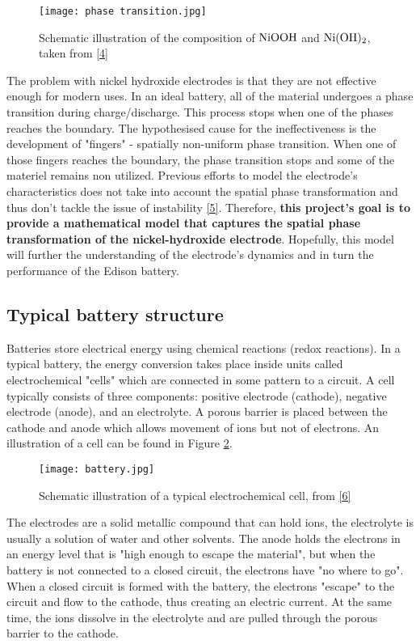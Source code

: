\documentclass[12pt]{article}
\begin{document}
\begin{figure}[h!] 
	\centering 
	\texttt{[image: phase transition.jpg]}
	\caption{Schematic illustration of the composition of $\ce{NiOOH}$ and $\ce{Ni(OH)_2}$, taken from \hyperref[c:4]{[4]}} \label{fig:composition}
\end{figure}

The problem with nickel hydroxide electrodes is that they are not effective enough for modern uses. In an ideal battery, all of the material undergoes a phase transition during charge/discharge. This process stops when one of the phases reaches the boundary. The hypothesised cause for the ineffectiveness is the development of "fingers" - spatially non-uniform phase transition. When one of those fingers reaches the boundary, the phase transition stops and some of the materiel remains non utilized. Previous efforts to model the electrode's characteristics does not take into account the spatial phase transformation and thus don't tackle the issue of instability \hyperref[c:5]{[5]}.
Therefore, \textbf{this project's goal is to provide a mathematical model that captures the spatial phase transformation of the nickel-hydroxide electrode}. Hopefully, this model will further the understanding of the electrode's dynamics and in turn the performance of the Edison battery.


\subsection{Typical battery structure} \label{sec:batt}
Batteries store electrical energy using chemical reactions (redox reactions). In a typical battery, the energy conversion takes place inside units called electrochemical "cells" which are connected in some pattern to a circuit. A cell typically consists of three components: positive electrode (cathode), negative electrode (anode), and an electrolyte. A porous barrier is placed between the cathode and anode which allows movement of ions but not of electrons. An illustration of a cell can be found in Figure \ref{fig:battery}.

\begin{figure}[h!] 
	\centering 
	\texttt{[image: battery.jpg]}
	\caption{Schematic illustration of a typical electrochemical cell, from \hyperref[c:6]{[6]}} \label{fig:battery}
\end{figure}

The electrodes are a solid metallic compound that can hold ions, the electrolyte is usually a solution of water and other solvents. The anode holds the electrons in an energy level that is "high enough to escape the material", but when the battery is not connected to a closed circuit, the electrons have "no where to go". When a closed circuit is formed with the battery, the electrons "escape" to the circuit and flow to the cathode, thus creating an electric current. At the same time, the ions dissolve in the electrolyte and are pulled through the porous barrier to the cathode. 
\end{document}
